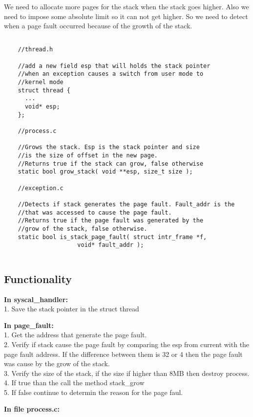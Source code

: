 We need to allocate more pages for the stack when the stack goes higher. Also we need to
impose some absolute limit so it can not get higher. So we need to detect when a page fault occurred because of the growth of the stack. 

\begin{lstlisting} 

	//thread.h

	//add a new field esp that will holds the stack pointer
	//when an exception causes a switch from user mode to
	//kernel mode
	struct thread {
	  ...
	  void* esp;
	};

	//process.c

	//Grows the stack. Esp is the stack pointer and size
	//is the size of offset in the new page.
	//Returns true if the stack can grow, false otherwise
	static bool grow_stack( void **esp, size_t size );

	//exception.c

	//Detects if stack generates the page fault. Fault_addr is the 
	//that was accessed to cause the page fault.
	//Returns true if the page fault was generated by the
	//grow of the stack, false otherwise.
	static bool is_stack_page_fault( struct intr_frame *f, 
					 void* fault_addr ); 
	
\end{lstlisting}


\subsection{Functionality}
 
\textbf{In syscal\_handler:}
	  \\1. Save the stack pointer in the struct thread

\textbf{In page\_fault:}
	  \\1. Get the address that generate the page fault.
	  \\2. Verify if stack cause the page fault by comparing the esp from current with the page fault address. If the difference between them is 32 or 4 then the page fault was cause by the grow of the stack.
	  \\3. Verify the size of the stack, if the size if higher than 8MB then destroy process.
	  \\4. If true than the call the method stack\_grow
	  \\5. If false continue to determin the reason for the page faul.

\textbf{In file process.c: }

